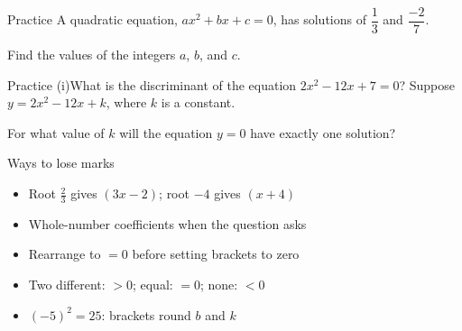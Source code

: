 \documentclass[aspectratio=169,11pt,xcolor=table,t]{beamer}
\newcommand\hp[1]{\fref{Handout p.\pageref{H-#1}}}
\begin{document}
\begin{frame}{Practice}
\relax
{} A quadratic equation, $ax^{2} + bx + c = 0$, has solutions of $\dfrac{1}{3}$ and $\dfrac{-2}{7}$.\par\smallskip
Find the values of the integers $a$, $b$, and $c$.
\end{frame}

\begin{frame}{Practice}
\relax
{} (i)\quad What is the discriminant of the equation $2x^{2} - 12x + 7 = 0$?
 Suppose $y = 2x^{2} - 12x + k$, where $k$ is a constant.\par
For what value of $k$ will the equation $y = 0$ have exactly one solution?
\end{frame}

\begin{frame}{Ways to lose marks}
\relax
\begin{itemize}
\item \textbf{} Root $\frac{2}{3}$ gives $(3x - 2)$; root $-4$ gives $(x + 4)$
\item \textbf{} Whole-number coefficients when the question asks
\item \textbf{} Rearrange to $= 0$ before setting brackets to zero
\item \textbf{} Two different: $> 0$; equal: $= 0$; none: $< 0$
\item \textbf{} $(-5)^{2} = 25$: brackets round $b$ and $k$
\end{itemize}
\hp{h3:lose}
\end{frame}
\end{document}
